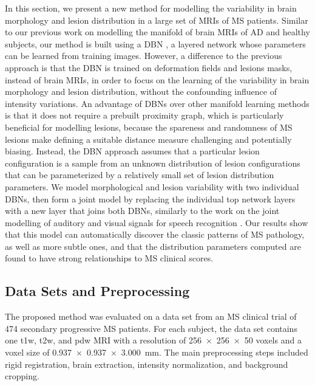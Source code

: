 In this section, we present a new method for modelling the variability in brain
morphology and lesion distribution in a large set of MRIs of MS patients.
Similar to our previous work on modelling the manifold of brain MRIs of AD and
healthy subjects, our method is built using a DBN \citep{hinton2006b}, a layered
network whose parameters can be learned from training images. However, a
difference to the previous approach is that the DBN is trained on deformation
fields and lesions masks, instead of brain MRIs, in order to focus on the
learning of the variability in brain morphology and lesion distribution, without
the confounding influence of intensity variations. An advantage of DBNs over
other manifold learning methods is that it does not require a prebuilt proximity
graph, which is particularly beneficial for modelling lesions, because the
spareness and randomness of MS lesions make defining a suitable distance measure
challenging and potentially biasing. Instead, the DBN approach assumes that a
particular lesion configuration is a sample from an unknown distribution of
lesion configurations that can be parameterized by a relatively small set of
lesion distribution parameters. We model morphological and lesion variability
with two individual DBNs, then form a joint model by replacing the individual
top network layers with a new layer that joins both DBNs, similarly to the work
on the joint modelling of auditory and visual signals for speech recognition
\citep{ngiam2011}. Our results show that this model can automatically discover
the classic patterns of MS pathology, as well as more subtle ones, and that the
distribution parameters computed are found to have strong relationships to MS
clinical scores.


\subsection[Data sets and preprocessing]{Data Sets and Preprocessing}

The proposed method was evaluated on a data set from an MS clinical trial of 474
secondary progressive MS patients. For each subject, the data set contains one
\gls{t1w}, \gls{t2w}, and \gls{pdw} MRI with a resolution of \num{256x256x50}
voxels and a voxel size of \SI{0.937x0.937x3.000}{\milli\meter}. The main
preprocessing steps included rigid registration, brain extraction, intensity
normalization, and background cropping.

